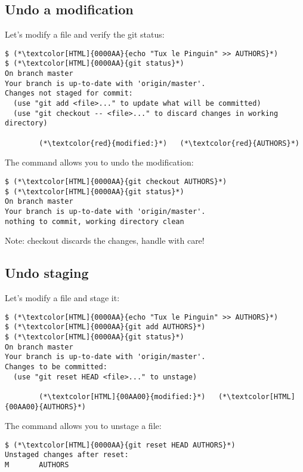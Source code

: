 \subsection{Undo a modification}
\begin{frame}[fragile]
\subslidetitle

  Let's modify a file and verify the git status:
  \begin{lstlisting}
$ (*\textcolor[HTML]{0000AA}{echo "Tux le Pinguin" >> AUTHORS}*)
$ (*\textcolor[HTML]{0000AA}{git status}*)
On branch master
Your branch is up-to-date with 'origin/master'.
Changes not staged for commit:
  (use "git add <file>..." to update what will be committed)
  (use "git checkout -- <file>..." to discard changes in working directory)

        (*\textcolor{red}{modified:}*)   (*\textcolor{red}{AUTHORS}*)

\end{lstlisting}

  The command  allows you to undo the modification:
  \begin{lstlisting}
$ (*\textcolor[HTML]{0000AA}{git checkout AUTHORS}*)
$ (*\textcolor[HTML]{0000AA}{git status}*)
On branch master
Your branch is up-to-date with 'origin/master'.
nothing to commit, working directory clean
\end{lstlisting}

Note: checkout discards the changes, handle with care!

\end{frame}

\subsection{Undo staging}
\begin{frame}[fragile]
\subslidetitle

  Let's modify a file and stage it:

\begin{lstlisting}
$ (*\textcolor[HTML]{0000AA}{echo "Tux le Pinguin" >> AUTHORS}*)
$ (*\textcolor[HTML]{0000AA}{git add AUTHORS}*)
$ (*\textcolor[HTML]{0000AA}{git status}*)
On branch master
Your branch is up-to-date with 'origin/master'.
Changes to be committed:
  (use "git reset HEAD <file>..." to unstage)

        (*\textcolor[HTML]{00AA00}{modified:}*)   (*\textcolor[HTML]{00AA00}{AUTHORS}*)
\end{lstlisting}

The command  allows you to unstage a file:

\begin{lstlisting}
$ (*\textcolor[HTML]{0000AA}{git reset HEAD AUTHORS}*)
Unstaged changes after reset:
M       AUTHORS
\end{lstlisting}

\end{frame}

